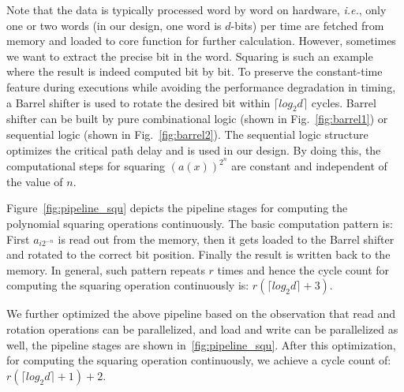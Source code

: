 \documentclass[runningheads]{llncs}
\begin{document}
Note that the data is typically processed word by word on hardware, \textit{i.e.}, only one or two words (in our design, one word is $d$-bits) per time are fetched from memory and loaded to core function for further calculation. However, sometimes we want to extract the precise bit in the word.
Squaring is such an example where the result is indeed computed bit by bit.
To preserve the constant-time feature during executions while
avoiding the performance degradation in timing,
a Barrel shifter
is used to rotate the desired bit within $\lceil log_2d\rceil$ cycles. Barrel shifter can be built by pure combinational logic (shown in Fig.~\ref{fig:barrel1}) or sequential logic (shown in Fig.~\ref{fig:barrel2}). The sequential logic structure optimizes the critical path delay and is used in our design. By doing this, the computational steps for squaring $(a(x))^{2^n}$ are constant and independent of the value of $n$.

Figure~\ref{fig:pipeline_squ} depicts the pipeline stages for computing the
polynomial squaring operations continuously.
The basic computation pattern is:
First $a_{i2^{-n}}$ is read out from the memory,
then it gets loaded to the Barrel shifter and rotated to the correct bit position.
Finally the result is written back to the memory.
In general, such pattern repeats $r$ times and
hence the cycle count for computing the squaring operation continuously is:
$
r(\lceil log_2d\rceil+3)
$.

We further optimized the above pipeline based on the observation
that read and rotation operations can be parallelized,
and load and write can be parallelized as well,
the pipeline stages are shown in~\ref{fig:pipeline_squ}.
After this optimization, for computing the squaring operation continuously, we achieve a cycle count of:
$r(\lceil log_2d\rceil+1)+2$.
\end{document}
